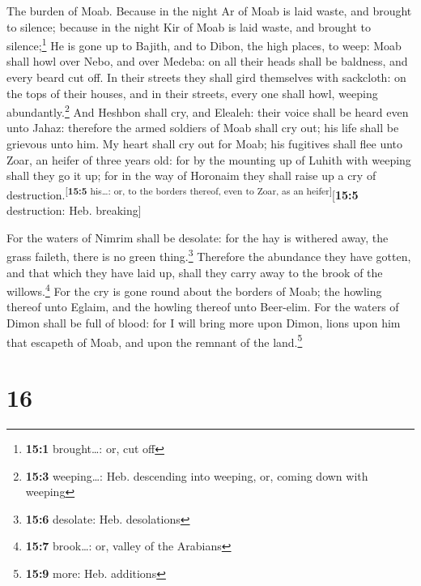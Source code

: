  The burden of Moab. Because in the night Ar of Moab is
laid waste, and brought to silence; because in the night Kir of Moab is
laid waste, and brought to silence;\footnote{\textbf{15:1}
  brought\ldots: or, cut off}  He is gone up to Bajith,
and to Dibon, the high places, to weep: Moab shall howl over Nebo, and
over Medeba: on all their heads shall be baldness, and every beard cut
off.  In their streets they shall gird themselves with
sackcloth: on the tops of their houses, and in their streets, every one
shall howl, weeping abundantly.\footnote{\textbf{15:3} weeping\ldots:
  Heb. descending into weeping, or, coming down with weeping}
 And Heshbon shall cry, and Elealeh: their voice shall be
heard even unto Jahaz: therefore the armed soldiers of Moab shall cry
out; his life shall be grievous unto him.  My heart shall
cry out for Moab; his fugitives shall flee unto Zoar, an heifer of three
years old: for by the mounting up of Luhith with weeping shall they go
it up; for in the way of Horonaim they shall raise up a cry of
destruction.\textsuperscript{{[}\textbf{15:5} his\ldots: or, to the
borders thereof, even to Zoar, as an heifer{]}}{[}\textbf{15:5}
destruction: Heb. breaking{]}

 For the waters of Nimrim shall be desolate: for the hay
is withered away, the grass faileth, there is no green thing.\footnote{\textbf{15:6}
  desolate: Heb. desolations}  Therefore the abundance
they have gotten, and that which they have laid up, shall they carry
away to the brook of the willows.\footnote{\textbf{15:7} brook\ldots:
  or, valley of the Arabians}  For the cry is gone round
about the borders of Moab; the howling thereof unto Eglaim, and the
howling thereof unto Beer-elim.  For the waters of Dimon
shall be full of blood: for I will bring more upon Dimon, lions upon him
that escapeth of Moab, and upon the remnant of the land.\footnote{\textbf{15:9}
  more: Heb. additions}

\hypertarget{section-15}{%
\section{16}\label{section-15}}


